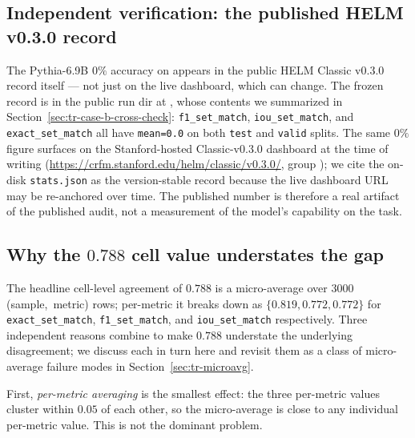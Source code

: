 \documentclass[11pt]{article}
\begin{document}
\subsection{Independent verification: the published HELM v0.3.0 record}
\label{sec:tr-case-b-dashboard}

The Pythia-6.9B $0\%$ accuracy on
   appears in the public HELM
  Classic v0.3.0 record itself --- not just on the live dashboard,
  which can change.
The frozen record is in the public run dir at
  ,
  whose contents we summarized in
  Section~\ref{sec:tr-case-b-cross-check}: \texttt{f1\_set\_match},
  \texttt{iou\_set\_match}, and \texttt{exact\_set\_match} all have
  \texttt{mean=0.0} on both \texttt{test} and \texttt{valid} splits.
The same $0\%$ figure surfaces on the Stanford-hosted Classic-v0.3.0
  dashboard at the time of writing
  (\url{https://crfm.stanford.edu/helm/classic/v0.3.0/}, group
  ); we cite the on-disk
  \texttt{stats.json} as the version-stable record because the live
  dashboard URL may be re-anchored over time.
The published number is therefore a real artifact of the published
  audit, not a measurement of the model's capability on the task.

\subsection{\texorpdfstring{Why the $0.788$ cell value understates the gap}{Why the 0.788 cell value understates the gap}}
\label{sec:tr-case-b-understates}

The headline cell-level agreement of $0.788$ is a micro-average over
  $3000$ \mbox{(sample, metric)} rows; per-metric it breaks down as
  $\{0.819, 0.772, 0.772\}$ for
  \texttt{exact\_set\_match}, \texttt{f1\_set\_match}, and
  \texttt{iou\_set\_match} respectively.
Three independent reasons combine to make $0.788$ understate the
  underlying disagreement; we discuss each in turn here and revisit
  them as a class of micro-average failure modes in
  Section~\ref{sec:tr-microavg}.

First, \emph{per-metric averaging} is the smallest effect: the three
  per-metric values cluster within $0.05$ of each other, so the
  micro-average is close to any individual per-metric value.
This is not the dominant problem.
\end{document}

